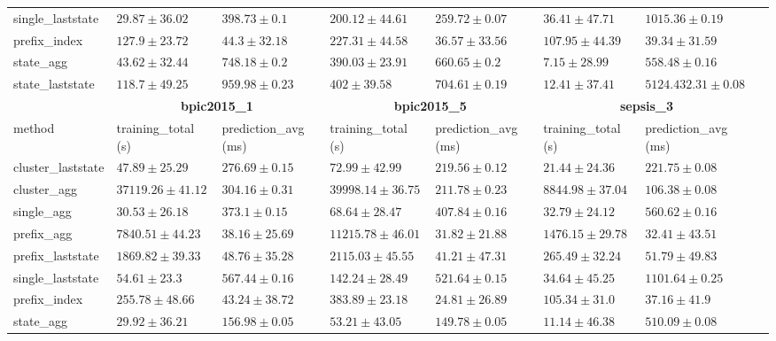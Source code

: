 \documentclass[twoside,11pt]{Latex/Classes/PhDthesisPSnPDF}
\begin{document}
\begin{table}[h]
{\begin{tabular}{llllllll}
			single\_laststate & $29.87 \pm 36.02$ & $398.73 \pm 0.1$ & $\mathbf{200.12 \pm 44.61}$ & $259.72 \pm 0.07$ & $36.41 \pm 47.71$ & $1015.36 \pm 0.19$ \\ 
			prefix\_index & $127.9 \pm 23.72$ & $44.3 \pm 32.18$ & $227.31 \pm 44.58$ & $36.57 \pm 33.56$ & $107.95 \pm 44.39$ & $39.34 \pm 31.59$ \\ 
			state\_agg & $43.62 \pm 32.44$ & $748.18 \pm 0.2$ & $390.03 \pm 23.91$ & $660.65 \pm 0.2$ & $\mathbf{7.15 \pm 28.99}$ & $558.48 \pm 0.16$ \\ 
			state\_laststate & $118.7 \pm 49.25$ & $959.98 \pm 0.23$ & $402 \pm 39.58$ & $704.61 \pm 0.19$ & $12.41 \pm 37.41$ & $5124.432.31 \pm 0.08$ \\ 
			\bottomrule
			\toprule
			& \multicolumn{2}{c}{{\bfseries bpic2015\_1}} & \multicolumn{2}{c}{{\bfseries bpic2015\_5}} & \multicolumn{2}{c}{{\bfseries sepsis\_3}} \\ \cmidrule(lr){2-3} \cmidrule(lr){4-5} \cmidrule(lr){6-7}
			method  & training\_total (s) & prediction\_avg (ms) & training\_total (s) & prediction\_avg (ms) & training\_total (s) & prediction\_avg (ms) \\ \midrule
			cluster\_laststate & $47.89 \pm 25.29$ & $276.69 \pm 0.15$ & $72.99 \pm 42.99$ & $219.56 \pm 0.12$ & $21.44 \pm 24.36$ & $221.75 \pm 0.08$ \\ 
			cluster\_agg & $37119.26 \pm 41.12$ & $304.16 \pm 0.31$ & $39998.14 \pm 36.75$ & $211.78 \pm 0.23$ & $8844.98 \pm 37.04$ & $106.38 \pm 0.08$ \\ 
			single\_agg & $30.53 \pm 26.18$ & $373.1 \pm 0.15$ & $68.64 \pm 28.47$ & $407.84 \pm 0.16$ & $32.79 \pm 24.12$ & $560.62 \pm 0.16$ \\ 
			prefix\_agg & $7840.51 \pm 44.23$ & $\mathbf{38.16 \pm 25.69}$ & $11215.78 \pm 46.01$ & $31.82 \pm 21.88$ & $1476.15 \pm 29.78$ & $\mathbf{32.41 \pm 43.51}$ \\ 
			prefix\_laststate & $1869.82 \pm 39.33$ & $48.76 \pm 35.28$ & $2115.03 \pm 45.55$ & $41.21 \pm 47.31$ & $265.49 \pm 32.24$ & $51.79 \pm 49.83$ \\ 
			single\_laststate & $54.61 \pm 23.3$ & $567.44 \pm 0.16$ & $142.24 \pm 28.49$ & $521.64 \pm 0.15$ & $34.64 \pm 45.25$ & $1101.64 \pm 0.25$ \\ 
			prefix\_index & $255.78 \pm 48.66$ & $43.24 \pm 38.72$ & $383.89 \pm 23.18$ & $\mathbf{24.81 \pm 26.89}$ & $105.34 \pm 31.0$ & $37.16 \pm 41.9$ \\ 
			state\_agg & $\mathbf{29.92 \pm 36.21}$ & $156.98 \pm 0.05$ & $\mathbf{53.21 \pm 43.05}$ & $149.78 \pm 0.05$ & $\mathbf{11.14 \pm 46.38}$ & $510.09 \pm 0.08$ \\ 

\end{tabular}}
\end{table}
\end{document}
